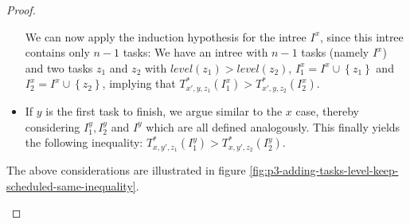 \begin{proof}
\begin{itemize}
    
    We can now apply the induction hypothesis for the intree $I^x$, since this intree contains only $n-1$ tasks: We have an intree with $n-1$ tasks (namely $I^x$) and two tasks $z_1$ and $z_2$ with $level(z_1)>level(z_2)$, $I^x_1 = I^x\cup\left\{ z_1 \right\}$ and $I^x_2 = I^x\cup\left\{ z_2 \right\}$, implying that $T^*_{x',y,z_1}(I^x_1)>T^*_{x',y,z_2}(I^x_{2})$.
  \item If $y$ is the first task to finish, we argue similar to the $x$ case, thereby considering $I^y_{1},I^y_{2}$ and $I^y$ which are all defined analogously. This finally yields the following inequality: $T^*_{x,y',z_1}(I^y_{1}) > T^*_{x,y',z_2}(I^y_{2})$.
  \end{itemize}

  The above considerations are illustrated in figure 
\ref{fig:p3-adding-tasks-level-keep-scheduled-same-inequality}.
  
  \begin{figure}[t]
    \centering
    \newcommand{\drawx}{
      \node[draw=black,circle] at (.9,3) {$x$};
    }
    \newcommand{\drawxx}{
      \node[draw=black,circle] at (.7,2) {$x'$};
    }
    \newcommand{\drawy}{
      \node[draw=black,circle] at (-1.5,4) {$y$};
    }
    \newcommand{\drawyy}{
      \node[draw=black,circle] at (-1.5,3) {$y'$};
    }
    \newcommand{\rawtriangle}{
      \draw
      [dotted, very thick,
      rounded corners]
      (0,0) -- (3,2) -- (3.5,8) -- (-3.5,8) -- (-3,2) -- cycle;
    }
    \newcommand{\treetriangle}{
      \rawtriangle;
      \drawx;
      \drawy;
    }
    \newcommand{\abstand}{7.5cm}
\end{figure}
\end{proof}
